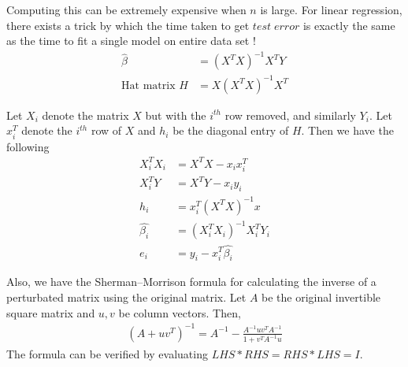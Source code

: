 \documentclass[11pt, a4paper]{article}
\begin{document}
    Computing this can be extremely expensive when $n$ is large. For linear regression, there exists a trick by which the time taken to get $test\;error$ is exactly the same as the time to fit a single model on entire data set !\newline
    \begin{align*}
        \hat{\beta} &= (X^{T}X)^{-1}X^{T}Y \\
        \text{Hat matrix  } H &= X(X^{T}X)^{-1}X^{T}
    \end{align*}
    
    Let $X_{i}$ denote the matrix $X$ but with the $i^{th}$ row removed, and similarly $Y_{i}$. Let $x_{i}^{T}$ denote the $i^{th}$ row of $X$ and $h_{i}$ be the diagonal entry of $H$. Then we have the following
    \begin{align*}
        X_{i}^{T}X_{i} &= X^{T}X - x_{i}x_{i}^{T}\\
        X_{i}^{T}Y &= X^{T}Y - x_{i}y_{i}\\
        h_{i} &= x_{i}^{T}(X^{T}X)^{-1}x \\
        \hat{\beta_{i}} &= (X_{i}^{T}X_{i})^{-1}X_{i}^{T}Y_{i} \\
        e_{i} &= y_{i} - x_{i}^{T}\hat{\beta_{i}}
    \end{align*}

    Also, we have the Sherman–Morrison formula for calculating the inverse of a perturbated matrix using the original matrix. Let $A$ be the original invertible square matrix and $u,v$ be column vectors. Then,
    \begin{align*}
        (A + uv^{T})^{-1} = A^{-1} - \frac{A^{-1}uv^{T}A^{-1}}{1+v^{T}A^{-1}u}
    \end{align*}
    The formula can be verified by evaluating $LHS * RHS = RHS * LHS = I$. \newline
\end{document}
